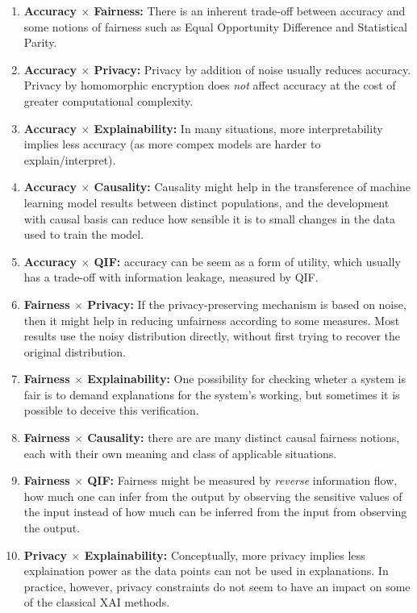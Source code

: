 \documentclass{article}
\begin{document}
\begin{enumerate}
    \item \textbf{Accuracy $\times$ Fairness:} There is an inherent trade-off between accuracy and some notions of fairness such as Equal Opportunity Difference and Statistical Parity.
    \item \textbf{Accuracy $\times$ Privacy:} Privacy by addition of noise usually reduces accuracy. Privacy by homomorphic encryption does \emph{not} affect accuracy at the cost of greater computational complexity.
    \item \textbf{Accuracy $\times$ Explainability:} In many situations, more interpretability implies less accuracy (as more compex models are harder to explain/interpret).
    \item \textbf{Accuracy $\times$ Causality:} Causality might help in the transference of machine learning model results between distinct populations, and the development with causal basis can reduce how sensible it is to small changes in the data used to train the model.
    \item \textbf{Accuracy $\times$ QIF:} accuracy can be seem as a form of utility, which usually has a trade-off with information leakage, measured by QIF.
    \item \textbf{Fairness $\times$ Privacy:} If the privacy-preserving mechanism is based on noise, then it might help in reducing unfairness according to some measures. Most results use the noisy distribution directly, without first trying to recover the original distribution.
    \item \textbf{Fairness $\times$ Explainability:} One possibility for checking wheter a system is fair is to demand explanations for the system's working, but sometimes it is possible to deceive this verification.
    \item \textbf{Fairness $\times$ Causality:} there are are many distinct causal fairness notions, each with their own meaning and class of applicable situations.
    \item \textbf{Fairness $\times$ QIF:} Fairness might be measured by \emph{reverse} information flow, how much one can infer from the output by observing the sensitive values of the input instead of how much can be inferred from the input from observing the output.
    \item \textbf{Privacy $\times$ Explainability:} Conceptually, more privacy implies less explaination power as the data points can not be used in explanations. In practice, however, privacy constraints do not seem to have an impact on some of the classical XAI methods.

\end{enumerate}
\end{document}
